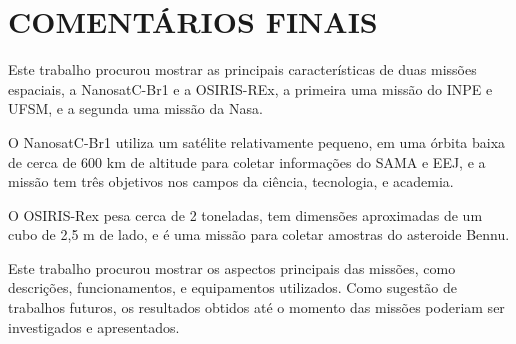 
\chapter{COMENTÁRIOS FINAIS}
\label{chp:conc}

Este trabalho procurou mostrar as principais características de duas missões espaciais, a NanosatC-Br1 e a OSIRIS-REx, a primeira uma missão do INPE e UFSM, e a segunda uma missão da Nasa.

O NanosatC-Br1 utiliza um satélite relativamente pequeno, em uma órbita baixa de cerca de 600 km de altitude para coletar informações do SAMA e EEJ, e a missão tem três objetivos nos campos da ciência, tecnologia, e academia.

O OSIRIS-Rex pesa cerca de 2 toneladas, tem dimensões aproximadas de um cubo de 2,5 m de lado, e é uma missão para coletar amostras do asteroide Bennu.

Este trabalho procurou mostrar os aspectos principais das missões, como descrições, funcionamentos, e equipamentos utilizados. Como sugestão de trabalhos futuros, os resultados obtidos até o momento das missões poderiam ser investigados e apresentados.